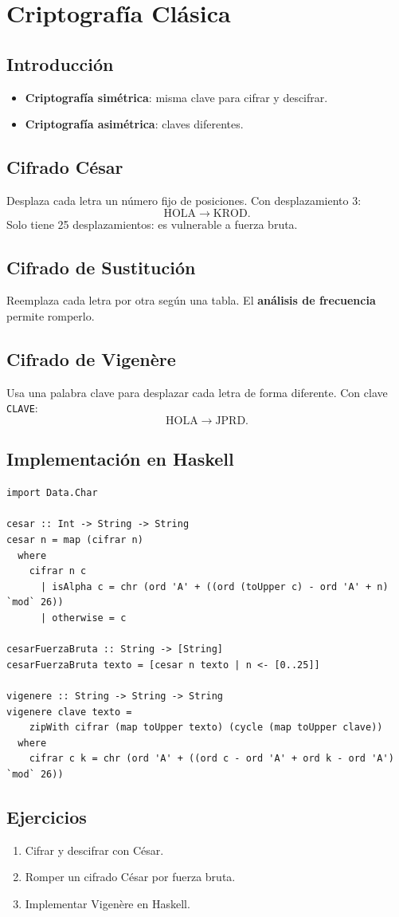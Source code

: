 \chapter{Criptografía Clásica}

\section{Introducción}
\begin{itemize}
  \item \textbf{Criptografía simétrica}: misma clave para cifrar y descifrar.
  \item \textbf{Criptografía asimétrica}: claves diferentes.
\end{itemize}

\section{Cifrado César}
Desplaza cada letra un número fijo de posiciones. Con desplazamiento 3:
\[
\text{HOLA} \to \text{KROD}.
\]
Solo tiene 25 desplazamientos: es vulnerable a fuerza bruta.

\section{Cifrado de Sustitución}
Reemplaza cada letra por otra según una tabla. El \textbf{análisis de frecuencia} permite romperlo.

\section{Cifrado de Vigenère}
Usa una palabra clave para desplazar cada letra de forma diferente. Con clave \texttt{CLAVE}:
\[
\text{HOLA} \to \text{JPRD}.
\]

\section{Implementación en Haskell}

\begin{lstlisting}[caption={Criptografía clásica en Haskell}]
import Data.Char

cesar :: Int -> String -> String
cesar n = map (cifrar n)
  where
    cifrar n c
      | isAlpha c = chr (ord 'A' + ((ord (toUpper c) - ord 'A' + n) `mod` 26))
      | otherwise = c

cesarFuerzaBruta :: String -> [String]
cesarFuerzaBruta texto = [cesar n texto | n <- [0..25]]

vigenere :: String -> String -> String
vigenere clave texto =
    zipWith cifrar (map toUpper texto) (cycle (map toUpper clave))
  where
    cifrar c k = chr (ord 'A' + ((ord c - ord 'A' + ord k - ord 'A') `mod` 26))
\end{lstlisting}

\section{Ejercicios}
\begin{enumerate}
  \item Cifrar y descifrar con César.
  \item Romper un cifrado César por fuerza bruta.
  \item Implementar Vigenère en Haskell.
\end{enumerate}